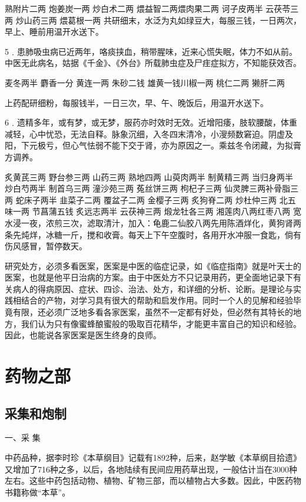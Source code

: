 \documentclass[a4paper,12pt,UTF8,twoside]{ctexbook}
\begin{document}
熟附片二两 炮姜炭一两 炒白术二两 煨益智二两煨肉果二两 诃子皮两半 云茯苓三两 炒山药三两 煨葛根一两
共研细末，水泛为丸如绿豆大，每服三钱，一日两次，早上、睡前用温开水送下。

5﹒患肺吸虫病已近两年，咯痰挟血，稍带腥味，近来心慌失眠，体力不如从前。中医无此病名，姑据《千金》、《外台》所载肺虫症及尸疰症拟方，不知能获效否。

麦冬两半 麝香一分 黄连一两 朱砂二钱 雄黄一钱川椒一两 桃仁二两 獭肝二两

上药配研细粉，每服钱半，一日三次，早、午、晚饭后，用温开水送下。

6﹒遗精多年，或有梦，或无梦，服药亦时效时无效。近增阳痿，肢软腰酸，体重减轻，心中忧恐，无法自释。脉象沉细，入冬四末清冷，小溲频数窘迫。阴虚及阳，下元极亏，但心气怯弱不能下交于肾，亦为原因之一。乘兹冬令闭藏，为拟膏方调养。

炙黄芪三两 野台参三两 山药三两 熟地四两 山萸肉两半 制黄精三两 当归身两半 炒白芍两半 制首乌三两 潼沙苑三两 菟丝饼三两 枸杞子三两 仙灵脾三两补骨脂三两 蛇床子两半 韭菜子二两 覆盆子二两 金樱子三两 炙狗脊二两 炒杜仲三两 北五味一两 节菖蒲五钱 炙远志两半 云茯神三两 煅龙牡各三两 湘莲肉八两红枣八两
宽水浸一夜，浓煎三次，滤取清汁，加入：龟鹿二仙胶八两先用陈酒烊化，黄狗肾两条先炖烊，冰糖一斤，搅和收膏。每天上下午空腹时，各用开水冲服一食匙，倘有伤风感冒，暂停数天。

研究处方，必须多看医案，医案是中医的临症记录，如《临症指南》就是叶天士的医案，也就是他平日治病的方案。由于中医处方不只记录用药，更全面地记录下有关病人的得病原因、症状、四诊、治法、处方，和详细的分析、论断。是理论与实践相结合的产物，对学习具有很大的帮助和启发作用。同时一个人的见解和经验毕竟有限，还必须广泛地多看各家医案，虽然不一定都有好处，但必然有其特长的地方，我们认为只有像蜜蜂酿蜜般的吸取百花精华，才能更丰富自己的知识和经验。因此，也能说各家医案是医生终身的良师。

\chapter{药物之部}

\section{采集和炮制}

一、采 集

中药品种，据李时珍《本草纲目》记载有1892种，后来，赵学敏《本草纲目拾遗》又增加了716种之多，以后，各地陆续有民间应用药草出现，一般估计当在3000种左右。这些中药包括动物、植物、矿物三部，而以植物占大多数。因此，中医药物书籍称做“本草”。
\end{document}
